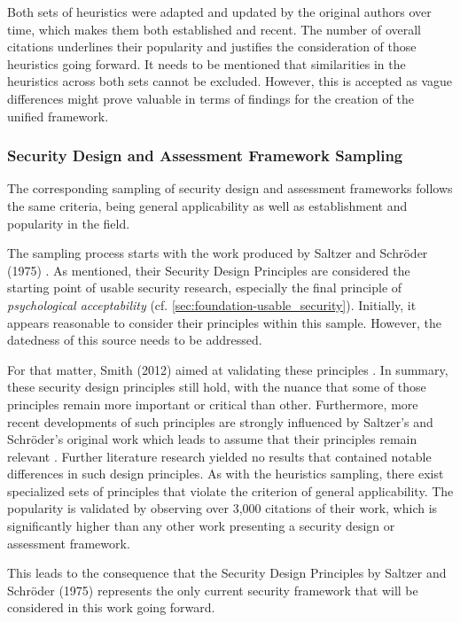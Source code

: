 Both sets of heuristics were adapted and updated by the original authors over time, which makes them both established and recent. The number of overall citations underlines their popularity and justifies the consideration of those heuristics going forward. It needs to be mentioned that similarities in the heuristics across both sets cannot be excluded. However, this is accepted as vague differences might prove valuable in terms of findings for the creation of the unified framework.

\subsubsection{Security Design and Assessment Framework Sampling}
The corresponding sampling of security design and assessment frameworks follows the same criteria, being general applicability as well as establishment and popularity in the field.

The sampling process starts with the work produced by Saltzer and Schröder (1975) \cite{saltzer_protection_1975}. As mentioned, their Security Design Principles are considered the starting point of usable security research, especially the final principle of \textit{psychological acceptability} (cf. \autoref{sec:foundation-usable_security}). Initially, it appears reasonable to consider their principles within this sample. However, the datedness of this source needs to be addressed.

For that matter, Smith (2012) aimed at validating these principles \cite{smith_contemporary_2012}. In summary, these security design principles still hold, with the nuance that some of those principles remain more important or critical than other. Furthermore, more recent developments of such principles are strongly influenced by Saltzer's and Schröder's original work which leads to assume that their principles remain relevant \cite{smith_contemporary_2012}. Further literature research yielded no results that contained notable differences in such design principles. As with the heuristics sampling, there exist specialized sets of principles that violate the criterion of general applicability. The popularity is validated by observing over 3,000 citations of their work, which is significantly higher than any other work presenting a security design or assessment framework.

This leads to the consequence that the Security Design Principles by Saltzer and Schröder (1975) represents the only current security framework that will be considered in this work going forward.

